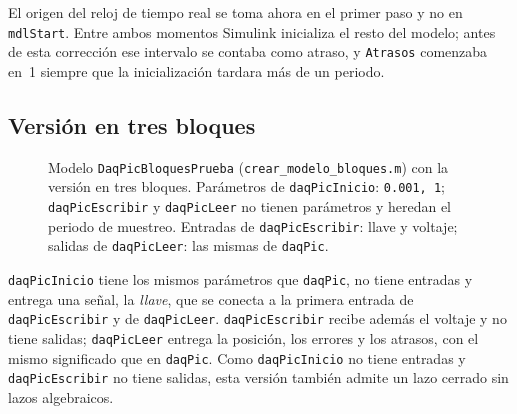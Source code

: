 \documentclass[11pt]{article}
\newcommand{\simmarco}[4]{%
  \fill[black!30] ({#1+2},{#2+2}) rectangle ({#3+2},{#4+2});
  \draw[simblk] (#1,#2) rectangle (#3,#4);}
\newcommand{\simnombre}[4]{\node[simname] at ({(#1+#3)/2},{#4+2}) {#2};}
\newcommand{\simsfun}[5]{%
  \simmarco{#1}{#2}{#3}{#4}
  \node[font=\scriptsize\ttfamily] at ({(#1+#3)/2},{(#2+#4)/2}) {#5};
  \simnombre{#1}{#5}{#3}{#4}}
\newcommand{\simseno}[5]{%
  \simmarco{#1}{#2}{#3}{#4}
  \draw[semithick, shift={({(#1+#3)/2},{(#2+#4)/2})}]
    plot[domain=-18:18, samples=37, smooth] (\x, {-9*sin(10*\x)});
  \simnombre{#1}{#5}{#3}{#4}}
\newcommand{\simscope}[5]{%
  \simmarco{#1}{#2}{#3}{#4}
  \draw[fill=black!10] ({#1+6},{#2+8}) rectangle ({#3-6},{#2+36});
  \draw[shift={({(#1+#3)/2},{#2+22})}]
    plot[domain=-12:12, samples=25, smooth] (\x, {-8*sin(15*\x)});
  \foreach \k in {-8,0,8} \draw ({(#1+#3)/2+\k},{#4-12}) circle (2.5);
  \simnombre{#1}{#5}{#3}{#4}}
\newcommand{\simdisplay}[5]{%
  \simmarco{#1}{#2}{#3}{#4}
  \node[font=\scriptsize\ttfamily, anchor=east, inner sep=0pt]
    at ({#3-6},{(#2+#4)/2}) {0};
  \simnombre{#1}{#5}{#3}{#4}}
\newcommand{\code}[1]{\texttt{#1}}
\begin{document}
El origen del reloj de tiempo real se toma ahora en el primer paso y no en
\code{mdlStart}. Entre ambos momentos Simulink inicializa el resto del
modelo; antes de esta corrección ese intervalo se contaba como atraso, y
\code{Atrasos} comenzaba en~1 siempre que la inicialización tardara más de
un periodo.

\subsection{Versión en tres bloques}

\begin{figure}[H]
\centering
{}
\caption{Modelo \code{DaqPicBloquesPrueba} (\code{crear\_modelo\_bloques.m})
con la versión en tres bloques. Parámetros de \code{daqPicInicio}:
\code{0.001, 1}; \code{daqPicEscribir} y \code{daqPicLeer} no tienen
parámetros y heredan el periodo de muestreo. Entradas de
\code{daqPicEscribir}: llave y voltaje; salidas de \code{daqPicLeer}: las
mismas de \code{daqPic}.}
\label{fig:sim-tres}
\end{figure}

\code{daqPicInicio} tiene los mismos parámetros que \code{daqPic}, no tiene
entradas y entrega una señal, la \emph{llave}, que se conecta a la primera
entrada de \code{daqPicEscribir} y de \code{daqPicLeer}.
\code{daqPicEscribir} recibe además el voltaje y no tiene salidas;
\code{daqPicLeer} entrega la posición, los errores y los atrasos, con el
mismo significado que en \code{daqPic}. Como \code{daqPicInicio} no tiene
entradas y \code{daqPicEscribir} no tiene salidas, esta versión también
admite un lazo cerrado sin lazos algebraicos.
\end{document}
